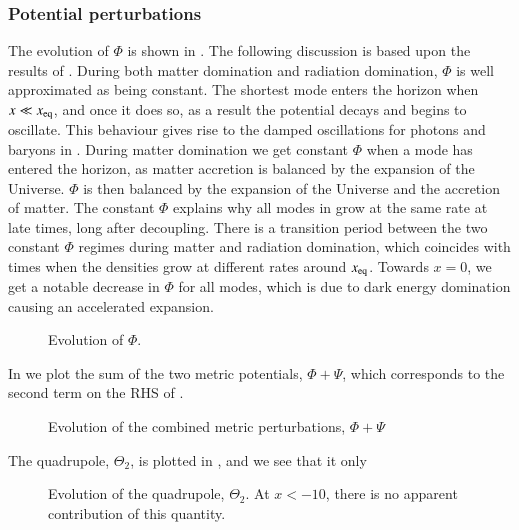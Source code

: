 \subsubsection{Potential perturbations} \label{sssec:M3:results:metric_perturbations}
The evolution of $\Phi$ is shown in . The following discussion is based upon the results of \cite[Ch. 8]{Dodelson}. During both matter domination and radiation domination, $\Phi$ is well approximated as being constant. The shortest mode enters the horizon when $x\ll x_\mathrm{eq}$, and once it does so, as a result the potential decays and begins to oscillate. This behaviour gives rise to the damped oscillations for photons and baryons in . During matter domination we get constant $\Phi$ when a mode has entered the horizon, as matter accretion is balanced by the expansion of the Universe. $\Phi$ is then balanced by the expansion of the Universe and the accretion of matter. The constant $\Phi$ explains why all modes in  grow at the same rate at late times, long after decoupling. There is a transition period between the two constant $\Phi$ regimes during matter and radiation domination, which coincides with times when the densities grow at different rates around $x_\mathrm{eq}$. Towards $x=0$, we get a notable decrease in $\Phi$ for all modes, which is due to dark energy domination causing an accelerated expansion. 


\begin{figure}[ht!]
    \caption{Evolution of $\Phi$.}
    \label{fig:M3:results:Phi}
\end{figure}

In  we plot the sum of the two metric potentials, $\Phi+\Psi$, which corresponds to the second term on the RHS of .
\begin{figure}[ht!]
    \caption{Evolution of the combined metric perturbations, $\Phi+\Psi$}
    \label{fig:M3:results:Phi_plus_Psi}
\end{figure}


The quadrupole, $\Theta_2$, is plotted in , and we see that it only 
\begin{figure}[ht!]
    \caption{Evolution of the quadrupole, $\Theta_2$. At $x<-10$, there is no apparent contribution of this quantity.}
    \label{fig:M3:results:Theta2}
\end{figure}
